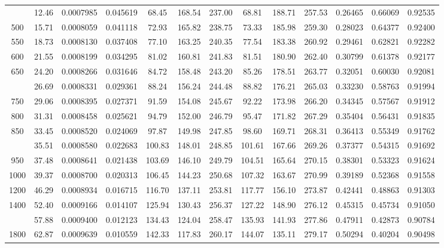 \documentclass[12pt,a3paper]{article}
\begin{document}
\begin{enumerate}
\begin{center}
\begin{longtable}{c c c c c c c c c c c c c}
\addlinespace
450 & 12.46 & 0.0007985 & 0.045619 & 68.45 & 168.54 & 237.00 & 68.81 & 188.71 & 257.53 & 0.26465 & 0.66069 & 0.92535 \\
500 & 15.71 & 0.0008059 & 0.041118 & 72.93 & 165.82 & 238.75 & 73.33 & 185.98 & 259.30 & 0.28023 & 0.64377 & 0.92400 \\
550 & 18.73 & 0.0008130 & 0.037408 & 77.10 & 163.25 & 240.35 & 77.54 & 183.38 & 260.92 & 0.29461 & 0.62821 & 0.92282 \\
600 & 21.55 & 0.0008199 & 0.034295 & 81.02 & 160.81 & 241.83 & 81.51 & 180.90 & 262.40 & 0.30799 & 0.61378 & 0.92177 \\
650 & 24.20 & 0.0008266 & 0.031646 & 84.72 & 158.48 & 243.20 & 85.26 & 178.51 & 263.77 & 0.32051 & 0.60030 & 0.92081 \\
\addlinespace
700 & 26.69 & 0.0008331 & 0.029361 & 88.24 & 156.24 & 244.48 & 88.82 & 176.21 & 265.03 & 0.33230 & 0.58763 & 0.91994 \\
750 & 29.06 & 0.0008395 & 0.027371 & 91.59 & 154.08 & 245.67 & 92.22 & 173.98 & 266.20 & 0.34345 & 0.57567 & 0.91912 \\
800 & 31.31 & 0.0008458 & 0.025621 & 94.79 & 152.00 & 246.79 & 95.47 & 171.82 & 267.29 & 0.35404 & 0.56431 & 0.91835 \\
850 & 33.45 & 0.0008520 & 0.024069 & 97.87 & 149.98 & 247.85 & 98.60 & 169.71 & 268.31 & 0.36413 & 0.55349 & 0.91762 \\
\addlinespace
900 & 35.51 & 0.0008580 & 0.022683 & 100.83 & 148.01 & 248.85 & 101.61 & 167.66 & 269.26 & 0.37377 & 0.54315 & 0.91692 \\
950 & 37.48 & 0.0008641 & 0.021438 & 103.69 & 146.10 & 249.79 & 104.51 & 165.64 & 270.15 & 0.38301 & 0.53323 & 0.91624 \\
1000 & 39.37 & 0.0008700 & 0.020313 & 106.45 & 144.23 & 250.68 & 107.32 & 163.67 & 270.99 & 0.39189 & 0.52368 & 0.91558 \\
1200 & 46.29 & 0.0008934 & 0.016715 & 116.70 & 137.11 & 253.81 & 117.77 & 156.10 & 273.87 & 0.42441 & 0.48863 & 0.91303 \\
1400 & 52.40 & 0.0009166 & 0.014107 & 125.94 & 130.43 & 256.37 & 127.22 & 148.90 & 276.12 & 0.45315 & 0.45734 & 0.91050 \\
\addlinespace
1600 & 57.88 & 0.0009400 & 0.012123 & 134.43 & 124.04 & 258.47 & 135.93 & 141.93 & 277.86 & 0.47911 & 0.42873 & 0.90784 \\
1800 & 62.87 & 0.0009639 & 0.010559 & 142.33 & 117.83 & 260.17 & 144.07 & 135.11 & 279.17 & 0.50294 & 0.40204 & 0.90498 \\

\end{longtable}
\end{center}
\end{enumerate}
\end{document}
